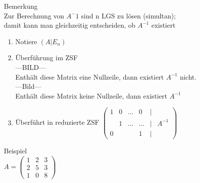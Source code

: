 \documentclass{scrartcl}
\begin{document}
	Bemerkung\\
	Zur Berechnung von $A^-1$ sind n LGS zu lösen (simultan);\\
	damit kann man gleichzeitig entscheiden, ob $A^{-1}$ existiert\\
	\begin{enumerate}
		\item
		Notiere $(A \vert E_n)$
		\item
		Überführung im ZSF \\
		---BILD---\\
		Enthält diese Matrix eine Nullzeile, dann existiert $A^{-1}$ nicht.\\
		---Bild---\\
		Enthält diese Matrix keine Nullzeile, dann existiert $A^{-1}$
		\item
		Überführt in reduzierte ZSF $\begin{pmatrix}
			1 & 0 & ... & 0 &\vert & \\
			& 1 & ... & ... & \vert & A^{-1}\\
			0 &  &  & 1 & \vert & 
		\end{pmatrix}$
	\end{enumerate}
	Beispiel\\
	$
	A = \begin{pmatrix}
		1 & 2 & 3 \\ 2 & 5 & 3 \\ 1 & 0 & 8
	\end{pmatrix}$\\
	
\end{document}
